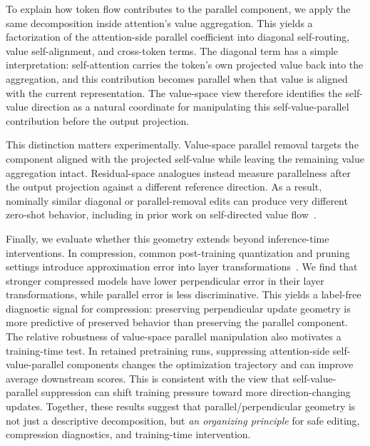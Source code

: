To explain how token flow contributes to the parallel component, we apply the
same decomposition inside attention's value aggregation. This yields a
factorization of the attention-side parallel coefficient into diagonal
self-routing, value self-alignment, and cross-token terms. The diagonal term
has a simple interpretation: self-attention carries the token's own projected
value back into the aggregation, and this contribution becomes parallel when
that value is aligned with the current representation. The value-space view
therefore identifies the self-value direction as a natural coordinate for
manipulating this self-value-parallel contribution before the output
projection.

This distinction matters experimentally. Value-space parallel removal targets
the component aligned with the projected self-value while leaving the remaining
value aggregation intact. Residual-space analogues instead measure parallelness
after the output projection against a different reference direction. As a
result, nominally similar diagonal or parallel-removal edits can produce very
different zero-shot behavior, including in prior work on self-directed value
flow~\citep{zhai2025xsa}.

Finally, we evaluate whether this geometry extends beyond inference-time
interventions. In compression, common post-training quantization and
pruning settings introduce approximation error into layer
transformations~\citep{Frantar2022GPTQAP,Lin2023AWQAW,Sun2023ASA}.
We find that stronger compressed models have lower perpendicular error in
their layer transformations, while parallel error is less discriminative. This
yields a label-free diagnostic signal for compression: preserving
perpendicular update geometry is more predictive of preserved behavior than
preserving the parallel component. The relative robustness of value-space
parallel manipulation also motivates a training-time test. In retained
pretraining runs, suppressing attention-side self-value-parallel components
changes the optimization trajectory and can improve average downstream scores.
This is consistent with the view that self-value-parallel suppression can
shift training pressure toward more direction-changing updates.
Together, these results suggest that parallel/perpendicular geometry is not
just a descriptive decomposition, but \textit{an organizing principle} for safe
editing, compression diagnostics, and training-time intervention.

